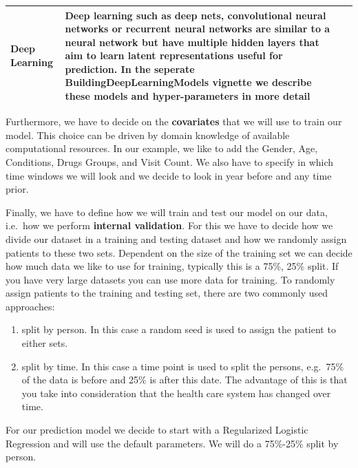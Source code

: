 \documentclass[]{article}
\providecommand{\tightlist}{%
  \setlength{\itemsep}{0pt}\setlength{\parskip}{0pt}}
\begin{document}
\begin{longtable}[]{@{}lll@{}}
\begin{minipage}[t]{0.12\columnwidth}
Deep Learning\strut
\end{minipage} & \begin{minipage}[t]{0.55\columnwidth}\raggedright\strut
Deep learning such as deep nets, convolutional neural networks or
recurrent neural networks are similar to a neural network but have
multiple hidden layers that aim to learn latent representations useful
for prediction. In the seperate BuildingDeepLearningModels vignette we
describe these models and hyper-parameters in more detail\strut
\end{minipage} & \begin{minipage}[t]{0.25\columnwidth}\raggedright\strut
\strut
\end{minipage}\tabularnewline
\bottomrule
\end{longtable}

Furthermore, we have to decide on the \textbf{covariates} that we will
use to train our model. This choice can be driven by domain knowledge of
available computational resources. In our example, we like to add the
Gender, Age, Conditions, Drugs Groups, and Visit Count. We also have to
specify in which time windows we will look and we decide to look in year
before and any time prior.

Finally, we have to define how we will train and test our model on our
data, i.e.~how we perform \textbf{internal validation}. For this we have
to decide how we divide our dataset in a training and testing dataset
and how we randomly assign patients to these two sets. Dependent on the
size of the training set we can decide how much data we like to use for
training, typically this is a 75\%, 25\% split. If you have very large
datasets you can use more data for training. To randomly assign patients
to the training and testing set, there are two commonly used approaches:

\begin{enumerate}
\def\labelenumi{\arabic{enumi}.}
\tightlist
\item
  split by person. In this case a random seed is used to assign the
  patient to either sets.
\item
  split by time. In this case a time point is used to split the persons,
  e.g.~75\% of the data is before and 25\% is after this date. The
  advantage of this is that you take into consideration that the health
  care system has changed over time.
\end{enumerate}

For our prediction model we decide to start with a Regularized Logistic
Regression and will use the default parameters. We will do a 75\%-25\%
split by person.
\end{document}
